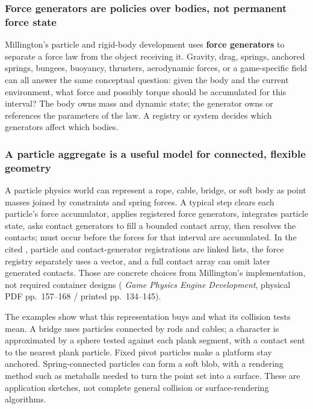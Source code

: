 \subsubsection{Force generators are policies over bodies, not permanent force state}\label{06-engine-ii-ch034-force-generators-are-policies-over-bodies-not-permanent-force-state}

\hypertarget{06-engine-ii-ch034-force-generators-are-policies-over-bodies-not-permanent-force-state}{}

Millington's particle and rigid-body development uses \textbf{force generators} to separate a force law from the object receiving it. Gravity, drag, springs, anchored springs, bungees, buoyancy, thrusters, aerodynamic forces, or a game-specific field can all answer the same conceptual question: given the body and the current environment, what force and possibly torque should be accumulated for this interval? The body owns mass and dynamic state; the generator owns or references the parameters of the law. A registry or system decides which generators affect which bodies.

\subsubsection{A particle aggregate is a useful model for connected, flexible geometry}\label{06-engine-ii-ch034-a-particle-aggregate-is-a-useful-model-for-connected-flexible-geometry}

\hypertarget{06-engine-ii-ch034-a-particle-aggregate-is-a-useful-model-for-connected-flexible-geometry}{}

A particle physics world can represent a rope, cable, bridge, or soft body as point masses joined by constraints and spring forces. A typical step clears each particle's force accumulator, applies registered force generators, integrates particle state, asks contact generators to fill a bounded contact array, then resolves the contacts;  must occur before the forces for that interval are accumulated. In the cited , particle and contact-generator registrations are linked lists, the force registry separately uses a vector, and a full contact array can omit later generated contacts. Those are concrete choices from Millington's implementation, not required container designs ( \emph{Game Physics Engine Development}, physical PDF pp.~157--168 / printed pp.~134--145).

The examples show what this representation buys and what its collision tests mean. A bridge uses particles connected by rods and cables; a character is approximated by a sphere tested against each plank segment, with a contact sent to the nearest plank particle. Fixed pivot particles make a platform stay anchored. Spring-connected particles can form a soft blob, with a rendering method such as metaballs needed to turn the point set into a surface. These are application sketches, not complete general collision or surface-rendering algorithms.

